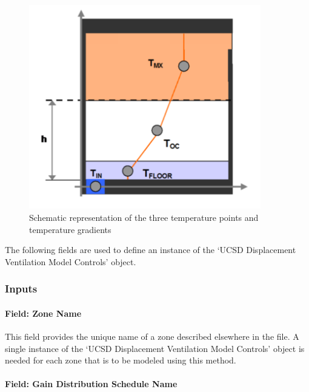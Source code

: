 \begin{figure}[hbtp] %
\centering
\includegraphics[width=0.9\textwidth, height=0.9\textheight, keepaspectratio=true]{media/image080.png}
\caption{Schematic representation of the three temperature points and temperature gradients \protect \label{fig:schematic-representation-of-the-three}}
\end{figure}

The following fields are used to define an instance of the `UCSD Displacement Ventilation Model Controls' object.

\subsubsection{Inputs}\label{inputs-8-020}

\paragraph{Field: Zone Name}\label{field-zone-name-4-005}

This field provides the unique name of a zone described elsewhere in the file. A single instance of the `UCSD Displacement Ventilation Model Controls' object is needed for each zone that is to be modeled using this method.

\paragraph{Field: Gain Distribution Schedule Name}\label{field-gain-distribution-schedule-name}

